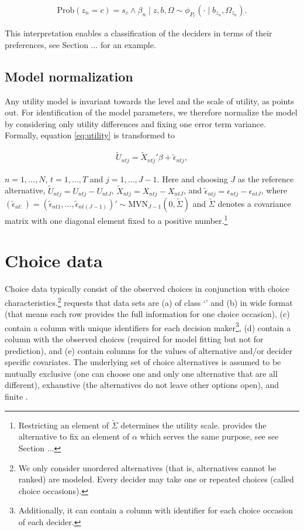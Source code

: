 \documentclass[article]{jss}
\newcommand{\class}[1]{`\code{#1}'}
\begin{document}
\begin{align*}
\text{Prob}(z_n=c)=s_c \land \beta_n \mid z,b,\Omega \sim \phi_{P_r}(\cdot \mid b_{z_n},\Omega_{z_n}).
\end{align*}

This interpretation enables a classification of the deciders in terms of their preferences, see Section ... for an example.

\subsection{Model normalization} \label{subsec:normalization}

Any utility model is invariant towards the level and the scale of utility, as \cite{Train:2009} points out. For identification of the model parameters, we therefore normalize the model by considering only utility differences and fixing one error term variance. Formally, equation \eqref{eq:utility} is transformed to

\begin{align*}
\tilde{U}_{ntj} = \tilde{X}_{ntj}' \beta + \tilde{\epsilon}_{ntj},
\end{align*}

$n=1,\dots,N$, $t=1,\dots,T$ and $j=1,\dots,J-1$. Here and choosing $J$ as the reference alternative, $\tilde{U}_{ntj} = U_{ntj} - U_{ntJ}$, $\tilde{X}_{ntj} = X_{ntj} - X_{ntJ}$, and $\tilde{\epsilon}_{ntj} = \epsilon_{ntj} - \epsilon_{ntJ}$, where $(\tilde{\epsilon}_{nt:}) = (\tilde{\epsilon}_{nt1},...,\tilde{\epsilon}_{nt(J-1)})' \sim \text{MVN}_{J-1} (0,\tilde{\Sigma})$ and $\tilde{\Sigma}$ denotes a covariance matrix with one diagonal element fixed to a positive number.\footnote{Restricting an element of $\tilde{\Sigma}$ determines the utility scale.  provides the alternative to fix an element of $\alpha$ which serves the same purpose, see see Section ...}

\section{Choice data} \label{sec:choice_data}

Choice data typically consist of the observed choices in conjunction with choice characteristics.\footnote{We only consider unordered alternatives (that is, alternatives cannot be ranked) are modeled. Every decider may take one or repeated choices (called choice occasions).}  requests that data sets are (a) of class \class{data.frame} and (b) in wide format (that means each row provides the full information for one choice occasion), (c) contain a column with unique identifiers for each decision maker\footnote{Additionally, it can contain a column with identifier for each choice occasion of each decider.}, (d) contain a column with the observed choices (required for model fitting but not for prediction), and (e) contain columns for the values of alternative and/or decider specific covariates. The underlying set of choice alternatives is assumed to be mutually exclusive (one can choose one and only one alternative that are all different), exhaustive (the alternatives do not leave other options open), and finite \citep{Train:2009}.
\end{document}
